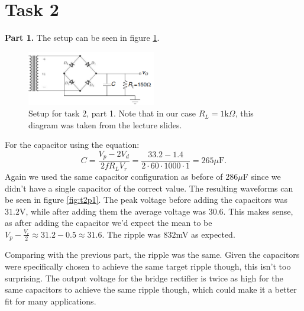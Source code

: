 \documentclass[letterpaper, reqno,11pt]{article}
\begin{document}
\section{Task 2}

{\medskip\noindent\bf Part 1.} The setup can be seen in figure \ref{fig:t2a}.

\begin{figure}[htpb]
        \centering
        \includegraphics[width=0.5\textwidth]{t2a}
        \caption{Setup for task 2, part 1. Note that in our case $R_L=1\text{k}\Omega$, this diagram was taken from the lecture slides.}
        \label{fig:t2a}
\end{figure}

For the capacitor using the equation:
\[
C = \frac{V_p-2V_d}{2fR_LV_r}=\frac{33.2-1.4}{2\cdot 60\cdot 1000\cdot 1}=265\mu\text{F}
.\]
Again we used the same capacitor configuration as before of $286\mu$F since we didn't have a single capacitor of the correct value. The resulting waveforms can be seen in figure \ref{fig:t2p1}. The peak voltage before adding the capacitors was $31.2$V, while after adding them the average voltage was 30.6. This makes sense, as after adding the capacitor we'd expect the mean to be $V_p-\frac{V_r}{2}\approx 31.2-0.5\approx 31.6$. The ripple was $832$mV as expected.

Comparing with the previous part, the ripple was the same. Given the capacitors were specifically chosen to achieve the same target ripple though, this isn't too surprising. The output voltage for the bridge rectifier is twice as high for the same capacitors to achieve the same ripple though, which could make it a better fit for many applications.
\end{document}
